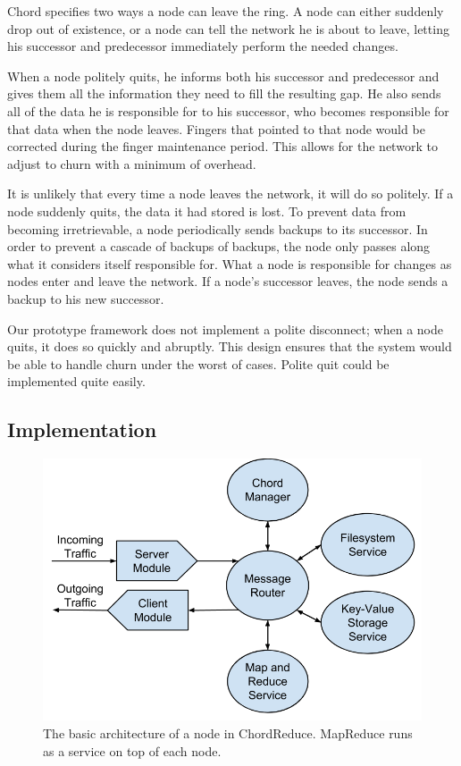 Chord specifies two ways a node can leave the ring.  A node can either suddenly drop out of existence, or a node can tell the network he is about to leave, letting his successor and predecessor immediately perform the needed changes.

When a node politely quits, he informs both his successor and predecessor and gives them all the information they need to fill the resulting gap. He also sends all of the data he is responsible for to his successor, who becomes responsible for that data when the node leaves.  Fingers that pointed to that node would be corrected during the finger maintenance period.  This allows for the network to adjust to churn with a minimum of overhead.

It is unlikely that every time a node leaves the network, it will do so politely.  If a node suddenly quits, the data it had stored is lost. To prevent data from becoming irretrievable, a node periodically sends backups to its successor.  In order to prevent a cascade of backups of backups, the node only passes along what it considers itself responsible for.  What a node is responsible for changes as nodes enter and leave the network.  If a node's successor leaves, the node sends a backup to his new successor. 

Our prototype framework does not implement a polite disconnect;  when a node quits, it does so quickly and abruptly.  This design ensures that the  system would be able to handle churn under the worst of cases.  Polite quit could be implemented quite easily.


\subsection{Implementation}

\begin{figure}
	\includegraphics[width=\linewidth]{figs/crArch}
	\caption{The basic architecture of a node in ChordReduce.  MapReduce runs as a service on top of each node.}
	\label{fig:crArch}
\end{figure}

